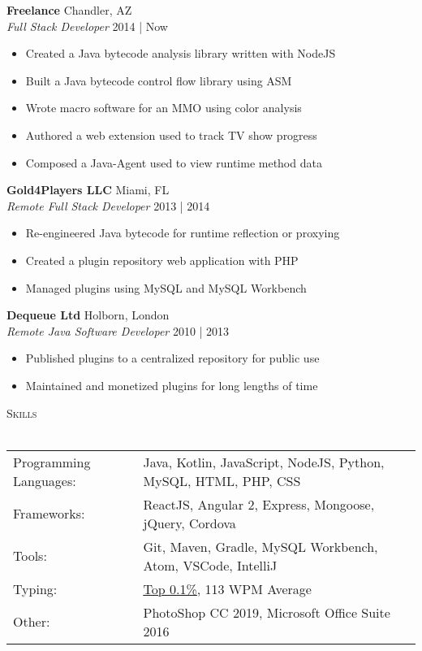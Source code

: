 \documentclass[a4paper]{article}
\newcommand{\lineunder} {
    \vspace*{-8pt} \\
    \hspace*{-18pt} \hrulefill \\
}
\newcommand{\header} [1] {
    {\hspace*{-18pt}\vspace*{6pt} \textsc{#1}}
    \vspace*{-6pt} \lineunder
}
\begin{document}
\textbf{Freelance} \hfill Chandler, AZ\\
\textit{Full Stack Developer} \hfill 2014 | Now\\
\vspace{-1mm}
\begin{itemize} \itemsep 1pt
	\item Created a Java bytecode analysis library written with NodeJS
	\item Built a Java bytecode control flow library using ASM
	\item Wrote macro software for an MMO using color analysis
	\item Authored a web extension used to track TV show progress
	\item Composed a Java-Agent used to view runtime method data
\end{itemize}
\textbf{Gold4Players LLC} \hfill Miami, FL\\
\textit{Remote Full Stack Developer} \hfill 2013 | 2014\\
\vspace{-1mm}
\begin{itemize} \itemsep 1pt
	\item Re-engineered Java bytecode for runtime reflection or proxying
	\item Created a plugin repository web application with PHP
	\item Managed plugins using MySQL and MySQL Workbench
\end{itemize}
\textbf{Dequeue Ltd} \hfill Holborn, London\\
\textit{Remote Java Software Developer} \hfill 2010 | 2013\\
\vspace{-1mm}
\begin{itemize} \itemsep 1pt
	\item Published plugins to a centralized repository for public use
	\item Maintained and monetized plugins for long lengths of time
\end{itemize}

\header{Skills}
\vspace{2mm}
\begin{tabular}{ l l }
	Programming Languages: & Java, Kotlin, JavaScript, NodeJS, Python, MySQL, HTML, PHP, CSS    \\
	Frameworks:            & ReactJS, Angular 2, Express, Mongoose, jQuery, Cordova
	\vspace{0.5mm}\\
	Tools:                 & Git, Maven, Gradle, MySQL Workbench, Atom, VSCode, IntelliJ
	\vspace{0.5mm}\\
	Typing:                & \href{https://data.typeracer.com/misc/badge?user=tsedlar}{\ul{Top 0.1\%}}, 113 WPM Average
	\vspace{0.5mm}\\
	Other:                 & PhotoShop CC 2019, Microsoft Office Suite 2016  \\
\end{tabular}
\vspace{2mm}
\end{document}
